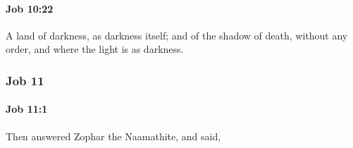 		\paragraph{Job 10:22} %
			\label{JOB-10-22}

			A land of darkness, as darkness itself; and of the shadow of death, without any order, and where the light is as darkness.

	\subsubsection{Job 11} %
		\label{JOB-11}

		\paragraph{Job 11:1} %
			\label{JOB-11-1}

			Then answered Zophar the Naamathite, and said,


